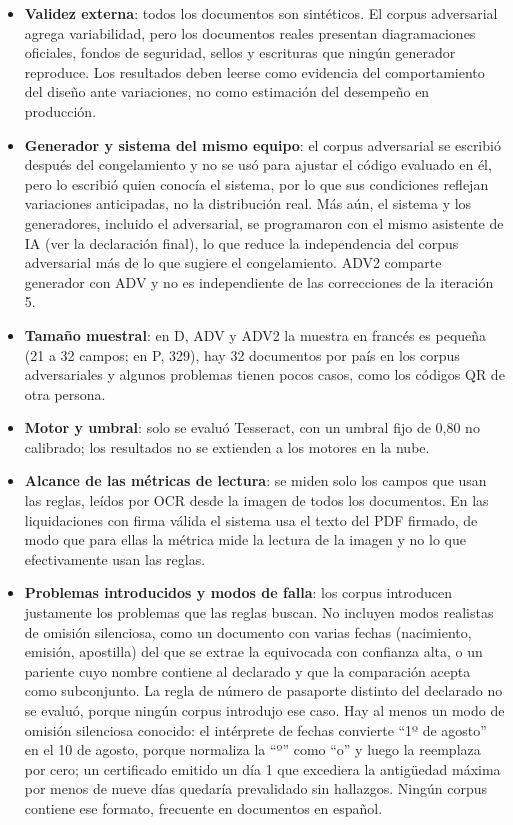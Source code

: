 \documentclass[11pt,a4paper]{article}
\begin{document}
\begin{itemize}
  \item \textbf{Validez externa}: todos los documentos son sintéticos. El corpus adversarial agrega variabilidad, pero los documentos reales presentan diagramaciones oficiales, fondos de seguridad, sellos y escrituras que ningún generador reproduce. Los resultados deben leerse como evidencia del comportamiento del diseño ante variaciones, no como estimación del desempeño en producción.
  \item \textbf{Generador y sistema del mismo equipo}: el corpus adversarial se escribió después del congelamiento y no se usó para ajustar el código evaluado en él, pero lo escribió quien conocía el sistema, por lo que sus condiciones reflejan variaciones anticipadas, no la distribución real. Más aún, el sistema y los generadores, incluido el adversarial, se programaron con el mismo asistente de IA (ver la declaración final), lo que reduce la independencia del corpus adversarial más de lo que sugiere el congelamiento. ADV2 comparte generador con ADV y no es independiente de las correcciones de la iteración 5.
  \item \textbf{Tamaño muestral}: en D, ADV y ADV2 la muestra en francés es pequeña (21 a 32 campos; en P, 329), hay 32 documentos por país en los corpus adversariales y algunos problemas tienen pocos casos, como los códigos QR de otra persona.
  \item \textbf{Motor y umbral}: solo se evaluó Tesseract, con un umbral fijo de 0,80 no calibrado; los resultados no se extienden a los motores en la nube.
  \item \textbf{Alcance de las métricas de lectura}: se miden solo los campos que usan las reglas, leídos por OCR desde la imagen de todos los documentos. En las liquidaciones con firma válida el sistema usa el texto del PDF firmado, de modo que para ellas la métrica mide la lectura de la imagen y no lo que efectivamente usan las reglas.
  \item \textbf{Problemas introducidos y modos de falla}: los corpus introducen justamente los problemas que las reglas buscan. No incluyen modos realistas de omisión silenciosa, como un documento con varias fechas (nacimiento, emisión, apostilla) del que se extrae la equivocada con confianza alta, o un pariente cuyo nombre contiene al declarado y que la comparación acepta como subconjunto. La regla de número de pasaporte distinto del declarado no se evaluó, porque ningún corpus introdujo ese caso. Hay al menos un modo de omisión silenciosa conocido: el intérprete de fechas convierte ``1º de agosto'' en el 10 de agosto, porque normaliza la ``º'' como ``o'' y luego la reemplaza por cero; un certificado emitido un día 1 que excediera la antigüedad máxima por menos de nueve días quedaría prevalidado sin hallazgos. Ningún corpus contiene ese formato, frecuente en documentos en español.

\end{itemize}
\end{document}
